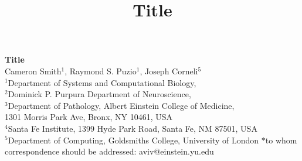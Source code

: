 




\let\ref\autoref


\title{Title}

\begin{center}
{\Large
\textbf{Title}
}
\\[.5cm]
Cameron Smith$^{1}$,
Raymond S. Puzio$^{1}$,
Joseph Corneli$^{5}$
\\[.5cm]
$^1$Department of Systems and Computational Biology,\\
$^2$Dominick P. Purpura Department of Neuroscience,\\
$^3$Department of Pathology, Albert Einstein College of Medicine,\\
1301 Morris Park Ave, Bronx, NY 10461, USA\\
$^4$Santa Fe Institute, 1399 Hyde Park Road, Santa Fe, NM 87501, USA
\\
$^5$Department of Computing, Goldsmiths College, University of London
$*$to whom correspondence should be addressed: aviv@einstein.yu.edu\\[.5cm]
\end{center}


